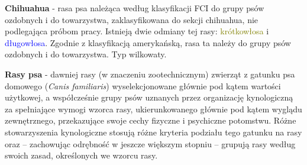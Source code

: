 \newpage
\textbf{Chihuahua} - rasa psa należąca według klasyfikacji FCI do grupy psów ozdobnych i do towarzystwa, zaklasyfikowana do sekcji chihuahua, nie podlegająca próbom pracy. Istnieją dwie odmiany tej rasy: \textcolor{olive}{krótkowłosa} i \textcolor{blue}{długowłosa}. Zgodnie z klasyfikacją amerykańską, rasa ta należy do grupy psów ozdobnych i do towarzystwa. Typ wilkowaty.\par
\textbf{Rasy psa} - dawniej rasy (w znaczeniu zootechnicznym) zwierząt z gatunku psa domowego (\textit{Canis familiaris}) wyselekcjonowane głównie pod kątem wartości użytkowej, a współcześnie grupy psów uznanych przez organizację kynologiczną za spełniające wymogi wzorca rasy, ukierunkowanego głównie pod kątem wyglądu zewnętrznego, przekazujące swoje cechy fizyczne i psychiczne potomstwu. Różne stowarzyszenia kynologiczne stosują różne kryteria podziału tego gatunku na rasy oraz – zachowując odrębność w jeszcze większym stopniu – grupują rasy według swoich zasad, określonych we wzorcu rasy.